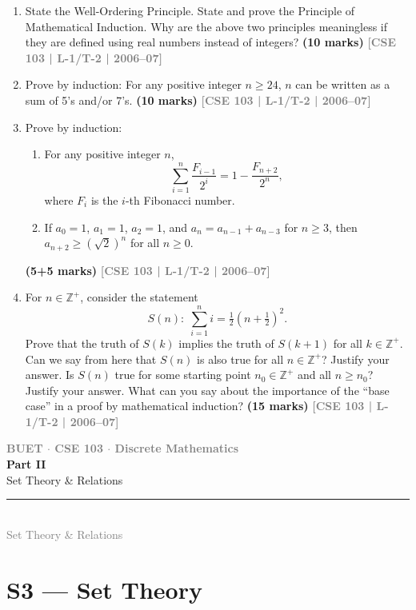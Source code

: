 \documentclass[12pt,a3paper]{article}
\newcommand{\yr}[1]{\hfill\textcolor{gray}{\small\textbf{[#1]}}}
\newcommand{\mk}[1]{\textcolor{orange!70!black}{\small\textbf{(#1 marks)}}}
\newcommand{\secdivider}[4]{%
  \newpage\thispagestyle{empty}%
  \vspace*{\fill}%
  \begin{tcolorbox}[enhanced,colback=#4!7,colframe=#3,boxrule=1.5pt,arc=8pt,
    left=20pt,right=20pt,top=22pt,bottom=22pt,
    shadow={3pt}{-3pt}{0pt}{black!15}]
    \centering
    {\large\textcolor{gray}{\textbf{BUET $\cdot$ CSE 103 $\cdot$ Discrete Mathematics}}}\\[8pt]
    {\fontsize{26}{32}\selectfont\bfseries\textcolor{#3}{#1}}\\[6pt]
    {\fontsize{15}{19}\selectfont\textcolor{dgray}{#2}}\\[12pt]
    \textcolor{#3!60}{\rule{0.5\textwidth}{0.5pt}}\\[6pt]
    {\small\textcolor{gray}{#2}}
  \end{tcolorbox}%
  \vspace*{\fill}\newpage%
}
\begin{document}
\begin{enumerate}
\item State the Well-Ordering Principle. State and prove the Principle of Mathematical Induction. Why are the above two principles meaningless if they are defined using real numbers instead of integers?
\mk{10} \yr{CSE 103 | L-1/T-2 | 2006--07}

\item Prove by induction: For any positive integer $n \geq 24$, $n$ can be written as a sum of 5's and/or 7's.
\mk{10} \yr{CSE 103 | L-1/T-2 | 2006--07}

\item Prove by induction:
\begin{enumerate}
  \item For any positive integer $n$,
  \[
    \sum_{i=1}^{n} \frac{F_{i-1}}{2^i} = 1 - \frac{F_{n+2}}{2^n},
  \]
  where $F_i$ is the $i$-th Fibonacci number.
  \item If $a_0 = 1$, $a_1 = 1$, $a_2 = 1$, and $a_n = a_{n-1} + a_{n-3}$ for $n \geq 3$, then $a_{n+2} \geq (\sqrt{2})^n$ for all $n \geq 0$.
\end{enumerate}
\mk{5+5} \yr{CSE 103 | L-1/T-2 | 2006--07}

\item For $n \in \mathbb{Z}^+$, consider the statement
\[
  S(n):\; \sum_{i=1}^{n} i = \tfrac{1}{2}\!\left(n + \tfrac{1}{2}\right)^{\!2}.
\]
Prove that the truth of $S(k)$ implies the truth of $S(k+1)$ for all $k \in \mathbb{Z}^+$. Can we say from here that $S(n)$ is also true for all $n \in \mathbb{Z}^+$? Justify your answer. Is $S(n)$ true for some starting point $n_0 \in \mathbb{Z}^+$ and all $n \geq n_0$? Justify your answer. What can you say about the importance of the ``base case'' in a proof by mathematical induction?
\mk{15} \yr{CSE 103 | L-1/T-2 | 2006--07}


\end{enumerate}

\secdivider{Part II}{Set Theory \& Relations}{cB}{cB}

\section{S3 --- Set Theory}
\label{sec:S3}
\end{document}
